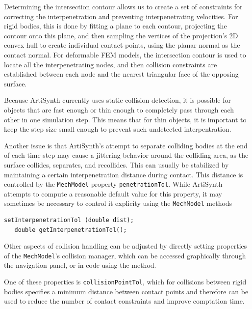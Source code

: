 Determining the intersection contour allows us to create a set of
constraints for correcting the interpenetration and preventing
interpenetrating velocities.  For rigid bodies, this is done by
fitting a plane to each contour, projecting the contour onto this
plane, and then sampling the vertices of the projection's 2D convex
hull to create individual contact points, using the planar normal as
the contact normal.  For deformable FEM models, the intersection
contour is used to locate all the interpenetrating nodes, and then
collision constraints are established between each node and the
nearest triangular face of the opposing surface.

Because ArtiSynth currently uses static collision detection, it is
possible for objects that are fast enough or thin enough to completely
pass through each other in one simulation step. This means that for
thin objects, it is important to keep the step size small enough to
prevent such undetected interpentration.

Another issue is that ArtiSynth's attempt to separate colliding bodies
at the end of each time step may cause a jittering behavior around the
colliding area, as the surface collides, separates, and recollides.
This can usually be stabilized by maintaining a certain
interpenetration distance during contact. This distance is controlled
by the {\tt MechModel} property {\tt penetrationTol}. While
ArtiSynth attempts to compute a reasonable default value for
this property, it may sometimes be necessary to control
it explicity using the {\tt MechModel} methods
%
\begin{lstlisting}[]
   setInterpenetrationTol (double dist);
   double getInterpenetrationTol();
\end{lstlisting}
%

Other aspects of collision handling can be adjusted by directly
setting properties of the {\tt MechModel}'s collision manager, which
can be accessed graphically through the navigation panel, or in code
using the
method.

One of these properties is {\tt collisionPointTol}, which for
collisions between rigid bodies specifies a minimum distance between
contact points and therefore can be used to reduce the number of
contact constraints and improve comptation time.


